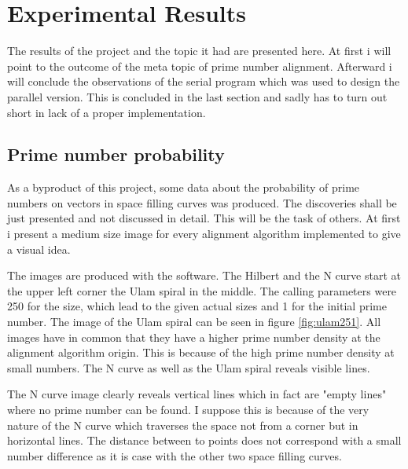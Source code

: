 \section{Experimental Results}
\label{sec:results}
The results of the project and the topic it had are presented here. At first i will point to the outcome of the meta topic of prime number alignment. Afterward i will conclude the observations of the serial program which was used to design the parallel version. This is concluded in the last section and sadly has to turn out short in lack of a proper implementation.

\subsection{Prime number probability}
\label{sec:resprob}
As a byproduct of this project, some data about the probability of prime numbers on vectors in space filling curves was produced. The discoveries shall be just presented and not discussed in detail. This will be the task of others. At first i present a medium size image for every alignment algorithm implemented to give a visual idea.
\begin{figure}[H]
\begin{minipage}[t]{0.475\textwidth}
\centering
\end{minipage}
\hfill
\begin{minipage}[t]{0.475\textwidth}
\centering
\end{minipage}
\end{figure}
The images are produced with the software. The Hilbert and the N curve start at the upper left corner the Ulam spiral in the middle. The calling parameters were 250 for the size, which lead to the given actual sizes and 1 for the initial prime number. The image of the Ulam spiral can be seen in figure \ref{fig:ulam251}. All images have in common that they have a higher prime number density at the alignment algorithm origin. This is because of the high prime number density at small numbers. The N curve as well as the Ulam spiral reveals visible lines.

The N curve image clearly reveals vertical lines which in fact are "empty lines" where no prime number can be found. I suppose this is because of the very nature of the N curve which traverses the space not from a corner but in horizontal lines. The distance between to points does not correspond with a small number difference as it is case with the other two space filling curves.

